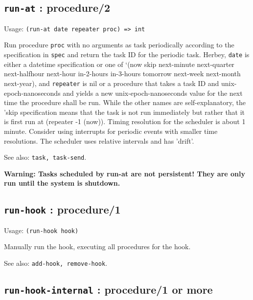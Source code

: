 \documentclass[
]{article}
\newcommand{\passthrough}[1]{#1}
\begin{document}
\hypertarget{run-at-procedure2-1}{%
\subsection{\texorpdfstring{\texttt{run-at} :
procedure/2}{run-at : procedure/2}}\label{run-at-procedure2-1}}

Usage: \passthrough{\lstinline!(run-at date repeater proc) => int!}

Run procedure \passthrough{\lstinline!proc!} with no arguments as task
periodically according to the specification in
\passthrough{\lstinline!spec!} and return the task ID for the periodic
task. Herbey, \passthrough{\lstinline!date!} is either a datetime
specification or one of `(now skip next-minute next-quarter
next-halfhour next-hour in-2-hours in-3-hours tomorrow next-week
next-month next-year), and \passthrough{\lstinline!repeater!} is nil or
a procedure that takes a task ID and unix-epoch-nanoseconds and yields a
new unix-epoch-nanoseconds value for the next time the procedure shall
be run. While the other names are self-explanatory, the 'skip
specification means that the task is not run immediately but rather that
it is first run at (repeater -1 (now)). Timing resolution for the
scheduler is about 1 minute. Consider using interrupts for periodic
events with smaller time resolutions. The scheduler uses relative
intervals and has 'drift'.

See also: \passthrough{\lstinline!task, task-send!}.

\textbf{Warning: Tasks scheduled by run-at are not persistent! They are
only run until the system is shutdown.}

\hypertarget{run-hook-procedure1-1}{%
\subsection{\texorpdfstring{\texttt{run-hook} :
procedure/1}{run-hook : procedure/1}}\label{run-hook-procedure1-1}}

Usage: \passthrough{\lstinline!(run-hook hook)!}

Manually run the hook, executing all procedures for the hook.

See also: \passthrough{\lstinline!add-hook, remove-hook!}.

\hypertarget{run-hook-internal-procedure1-or-more-1}{%
\subsection{\texorpdfstring{\texttt{run-hook-internal} : procedure/1 or
more}{run-hook-internal : procedure/1 or more}}\label{run-hook-internal-procedure1-or-more-1}}
\end{document}
